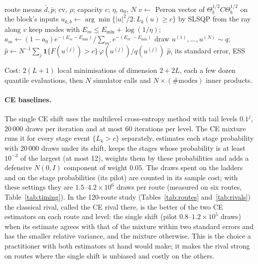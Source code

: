 \documentclass[ijoc,sglanonrev]{informs4}
\begin{document}
\begin{algorithm}[t]
\caption{SMIS for one route}\label{alg:smis}
\begin{algorithmic}[1]
\Require route means $\bar d,\bar p$; cv, $\rho$; capacity $c$; $\eta$, $a_0$, $N$
  \State $v\gets$ Perron vector of $\Theta_b^{1/2}C\Theta_b^{1/2}$ on the block's inputs
  \State $u_{k,b}\gets\arg\min\{|u|^2/2 : L_k(u)\ge c\}$ by SLSQP from the ray along $v$
\EndFor
\State keep modes with $E_m\le E_{\min}+\log(1/\eta)$; $a_m\gets(1-a_0)e^{-(E_m-E_{\min})}/\sum_{m'}e^{-(E_{m'}-E_{\min})}$
\State draw $u^{(1)},\dots,u^{(N)}\sim q$; $\hat p\gets N^{-1}\sum_j \mathbf 1\{F(u^{(j)})>c\}\,\varphi(u^{(j)})/q(u^{(j)})$
\State \Return $\hat p$, its standard error, ESS
\end{algorithmic}
\end{algorithm}

Cost: $2(L+1)$ local minimisations of dimension $2+2L$, each a few dozen
quantile evaluations, then $N$ simulator calls and $N\times(\#\text{modes})$
inner products.

\paragraph{CE baselines.} The single CE shift uses the multilevel
cross-entropy method with tail levels $0.1^j$, $20\,000$ draws per iteration
and at most $60$ iterations per level. The CE mixture runs it for every stage
event $\{L_k>c\}$ separately, estimates each stage probability with
$20\,000$ draws under its shift, keeps the stages whose probability is at least
$10^{-3}$ of the largest (at most 12), weights them by these probabilities and
adds a defensive $N(0,I)$ component of weight $0.05$. The draws spent on the
ladders and on the stage probabilities (its pilot) are counted in its sample
cost; with these settings they are $1.5$--$4.2\times10^6$ draws per route
(measured on six routes, Table~\ref{tab:timing}). In the 120-route study
(Tables~\ref{tab:routes} and~\ref{tab:rivals}) the classical rival, called the
CE rival there, is the better of the two CE estimators on each route and level:
the single shift (pilot $0.8$--$1.2\times10^5$ draws) when its estimate agrees
with that of the mixture within two standard errors and has the smaller relative
variance, and the mixture otherwise. This is the choice a practitioner with
both estimators at hand would make; it makes the rival strong on routes where
the single shift is unbiased and costly on the others.
\end{document}
